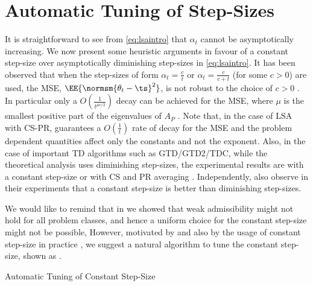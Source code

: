 \section{Automatic Tuning of Step-Sizes}\label{sec:stepsizes}
It is straightforward to see from \eqref{eq:lsaintro} that $\alpha_t$ cannot be asymptotically increasing. We now present some heuristic arguments in favour of a constant step-size over asymptotically diminishing step-sizes in \eqref{eq:lsaintro}.
It has been observed that when the step-sizes of form $\alpha_t=\frac{c}{t}$ or $\alpha_t=\frac{c}{c+t}$ (for some $c>0$) are used, the MSE, $\EE{\normsm{\theta_t-\ts}^2}$, is not robust to the choice of $c>0$ \cite{korda-prashanth,bach-moulines}. In particular only a $O(\frac{1}{t^{{\mu c}/2}})$ decay can be achieved for the MSE, where $\mu$ is the smallest positive part of the eigenvalues of  $A_P$ \cite{bach-moulines}. Note that, in the case of LSA with CS-PR,  guarantees a $O(\frac{1}{t})$ rate of decay for the MSE and the problem dependent quantities affect only the constants and not the exponent. Also, in the case of important TD algorithms such as GTD/GTD2/TDC, while the theoretical analysis uses diminishing step-sizes, the experimental results are with a constant step-size or with CS and PR averaging \cite{gtd2,gtdmp}. Independently, \citet{dann} also observe in their experiments that a constant step-size is better than diminishing step-sizes.\par
We would like to remind that in  we showed that weak admissibility might not hold for all problem classes, and hence a uniform choice for the constant step-size might not be possible, However, motivated by  and also by the usage of constant step-size in practice \cite{dann,gtd2,gtdmp}, we suggest a natural algorithm to tune the constant step-size, shown as .\par
\begin{algorithm}
\caption{Automatic Tuning of Constant Step-Size}
\begin{algorithmic}[1]
\ENDIF
\ENDFOR
\end{algorithmic}
\label{alg:tuning}
\end{algorithm}
